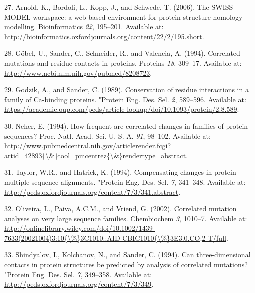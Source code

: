 \documentclass[12pt,a4paper,twoside]{book}
\theoremstyle{definition}
\theoremstyle{definition}
\theoremstyle{remark}
\begin{document}
\hypertarget{ref-Arnold2006}{}
27. Arnold, K., Bordoli, L., Kopp, J., and Schwede, T. (2006). The
SWISS-MODEL workspace: a web-based environment for protein structure
homology modelling. Bioinformatics \emph{22}, 195--201. Available at:
\url{http://bioinformatics.oxfordjournals.org/content/22/2/195.short}.

\hypertarget{ref-Gobel1994}{}
28. Göbel, U., Sander, C., Schneider, R., and Valencia, A. (1994).
Correlated mutations and residue contacts in proteins. Proteins
\emph{18}, 309--17. Available at:
\url{http://www.ncbi.nlm.nih.gov/pubmed/8208723}.

\hypertarget{ref-Godzik1989}{}
29. Godzik, A., and Sander, C. (1989). Conservation of residue
interactions in a family of Ca-binding proteins. "Protein Eng. Des. Sel.
\emph{2}, 589--596. Available at:
\url{https://academic.oup.com/peds/article-lookup/doi/10.1093/protein/2.8.589}.

\hypertarget{ref-Neher1994}{}
30. Neher, E. (1994). How frequent are correlated changes in families of
protein sequences? Proc. Natl. Acad. Sci. U. S. A. \emph{91}, 98--102.
Available at:
\href{http://www.pubmedcentral.nih.gov/articlerender.fcgi?artid=42893\%7B/\&\%7Dtool=pmcentrez\%7B/\&\%7Drendertype=abstract}{http://www.pubmedcentral.nih.gov/articlerender.fcgi?artid=42893\{\textbackslash{}\&\}tool=pmcentrez\{\textbackslash{}\&\}rendertype=abstract}.

\hypertarget{ref-Taylor1994}{}
31. Taylor, W.R., and Hatrick, K. (1994). Compensating changes in
protein multiple sequence alignments. "Protein Eng. Des. Sel. \emph{7},
341--348. Available at:
\url{http://peds.oxfordjournals.org/content/7/3/341.abstract}.

\hypertarget{ref-Oliveira2002}{}
32. Oliveira, L., Paiva, A.C.M., and Vriend, G. (2002). Correlated
mutation analyses on very large sequence families. Chembiochem \emph{3},
1010--7. Available at:
\href{http://onlinelibrary.wiley.com/doi/10.1002/1439-7633(20021004)3:10\%7B/\%\%7D3C1010::AID-CBIC1010\%7B/\%\%7D3E3.0.CO;2-T/full}{http://onlinelibrary.wiley.com/doi/10.1002/1439-7633(20021004)3:10\{\textbackslash{}\%\}3C1010::AID-CBIC1010\{\textbackslash{}\%\}3E3.0.CO;2-T/full}.

\hypertarget{ref-Shindyalov1994}{}
33. Shindyalov, I., Kolchanov, N., and Sander, C. (1994). Can
three-dimensional contacts in protein structures be predicted by
analysis of correlated mutations? "Protein Eng. Des. Sel. \emph{7},
349--358. Available at:
\url{http://peds.oxfordjournals.org/content/7/3/349}.
\end{document}
